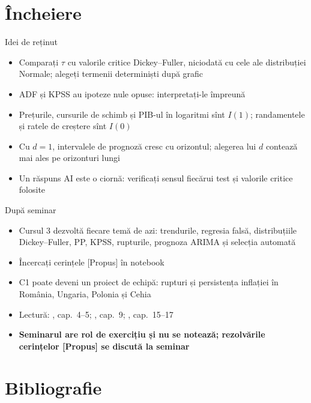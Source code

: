 \section{Încheiere}

\begin{frame}{Idei de reținut}
\itemsize{\small}
\begin{itemize}
    \item Comparați $\tau$ cu valorile critice Dickey--Fuller, niciodată cu cele ale distribuției Normale; alegeți termenii determiniști după grafic
    \item ADF și KPSS au ipoteze nule opuse: interpretați-le împreună
    \item Prețurile, cursurile de schimb și PIB-ul în logaritmi sînt $I(1)$; randamentele și ratele de creștere sînt $I(0)$
    \item Cu $d = 1$, intervalele de prognoză cresc cu orizontul; alegerea lui $d$ contează mai ales pe orizonturi lungi
    \item Un răspuns AI este o ciornă: verificați sensul fiecărui test și valorile critice folosite
\end{itemize}
\end{frame}

\begin{frame}{După seminar}
\itemsize{\small}
\begin{itemize}
    \item Cursul 3 dezvoltă fiecare temă de azi: trendurile, regresia falsă, distribuțiile Dickey--Fuller, PP, KPSS, rupturile, prognoza ARIMA și selecția automată
    \item Încercați cerințele [Propus] în notebook
    \item C1 poate deveni un proiect de echipă: rupturi și persistența inflației în România, Ungaria, Polonia și Cehia
    \item Lectură: , cap.~4--5; , cap.~9; , cap.~15--17
    \item \textbf{Seminarul are rol de exercițiu și nu se notează; rezolvările cerințelor [Propus] se discută la seminar}
\end{itemize}
\end{frame}


\section{Bibliografie}

